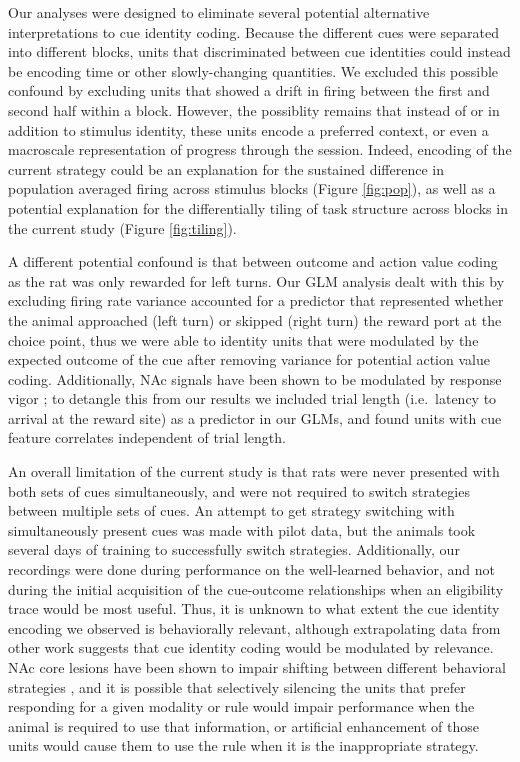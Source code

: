 \documentclass[11pt]{article}
\let\cite=\citep
\begin{document}
Our analyses were designed to eliminate several potential alternative
interpretations to cue identity coding. Because the different cues
were separated into different blocks, units that discriminated between
cue identities could instead be encoding time or other slowly-changing
quantities. We excluded this possible confound by excluding units that
showed a drift in firing between the first and second half within a
block. However, the possiblity remains that instead of or in addition
to stimulus identity, these units encode a preferred context, or even
a macroscale representation of progress through the session. Indeed,
encoding of the current strategy could be an explanation for the
sustained difference in population averaged firing across stimulus
blocks (Figure \ref{fig:pop}), as well as a potential explanation for
the differentially tiling of task structure across blocks in the
current study (Figure \ref{fig:tiling}).

A different potential confound is that between outcome and action
value coding as the rat was only rewarded for left turns. Our GLM analysis dealt with this by excluding firing rate variance accounted for a predictor that represented whether the animal approached (left turn) or skipped (right turn) the reward port at the choice point, thus we were able to identity units that were modulated by the expected outcome of the cue after removing variance for potential action value coding. Additionally, NAc signals have
been shown to be modulated by response vigor \cite{McGinty2013}; to
detangle this from our results we included trial length (i.e.\ latency
to arrival at the reward site) as a predictor in our GLMs, and found
units with cue feature correlates independent of trial length.

An overall limitation of the current study is that rats were never
presented with both sets of cues simultaneously, and were not required
to switch strategies between multiple sets of cues. An attempt to get strategy switching with simultaneously present cues was made with pilot data, but the animals took several days of training to successfully switch strategies. Additionally, our recordings were done during performance on the well-learned behavior, and not during the initial acquisition of the cue-outcome relationships when an eligibility trace would be most useful. Thus, it is
unknown to what extent the cue identity encoding we observed is
behaviorally relevant, although extrapolating data from other work
\cite{Sleezer2016} suggests that cue identity coding would be
modulated by relevance. NAc core lesions have been shown to impair
shifting between different behavioral strategies \cite{Floresco2006a},
and it is possible that selectively silencing the units that prefer
responding for a given modality or rule would impair performance when
the animal is required to use that information, or artificial
enhancement of those units would cause them to use the rule when it is
the inappropriate strategy.
\end{document}
